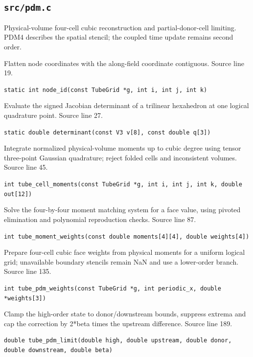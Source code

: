 \subsection{\texttt{src/pdm.c}}
Physical-volume four-cell cubic reconstruction and partial-donor-cell limiting. PDM4 describes the spatial stencil; the coupled time update remains second order.
\begin{description}[style=nextline,leftmargin=0pt,labelindent=0pt,labelwidth=0pt,labelsep=0pt]
\item[\texttt{node\_id}] Flatten node coordinates with the along-field coordinate contiguous. Source line 19.\par
{\small\nolinkurl{static int node_id(const TubeGrid *g, int i, int j, int k)}}
\item[\texttt{determinant}] Evaluate the signed Jacobian determinant of a trilinear hexahedron at one logical quadrature point. Source line 27.\par
{\small\nolinkurl{static double determinant(const V3 v[8], const double q[3])}}
\item[\texttt{tube\_cell\_moments}] Integrate normalized physical-volume moments up to cubic degree using tensor three-point Gaussian quadrature; reject folded cells and inconsistent volumes. Source line 45.\par
{\small\nolinkurl{int tube_cell_moments(const TubeGrid *g, int i, int j, int k, double out[12])}}
\item[\texttt{tube\_moment\_weights}] Solve the four-by-four moment matching system for a face value, using pivoted elimination and polynomial reproduction checks. Source line 87.\par
{\small\nolinkurl{int tube_moment_weights(const double moments[4][4], double weights[4])}}
\item[\texttt{tube\_pdm\_weights}] Prepare four-cell cubic face weights from physical moments for a uniform logical grid; unavailable boundary stencils remain NaN and use a lower-order branch. Source line 135.\par
{\small\nolinkurl{int tube_pdm_weights(const TubeGrid *g, int periodic_x, double *weights[3])}}
\item[\texttt{tube\_pdm\_limit}] Clamp the high-order state to donor/downstream bounds, suppress extrema and cap the correction by 2*beta times the upstream difference. Source line 189.\par
{\small\nolinkurl{double tube_pdm_limit(double high, double upstream, double donor, double downstream, double beta)}}
\end{description}

